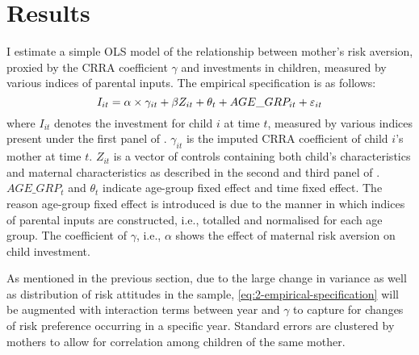 \documentclass[]{article}
\begin{document}
\section{Results}
I estimate a simple OLS model of the relationship between mother's risk aversion, proxied by the CRRA coefficient $\gamma$ and investments in children, measured by various indices of parental inputs. The empirical specification is as follows:
\begin{equation}
	I_{it} = \alpha \times \gamma_{it} + \beta{\boldmath Z_{it}} + \theta_t + AGE\_GRP_{it} + \varepsilon_{it}
	\label{eq:2-empirical-specification}
\end{equation}
where $I_{it}$ denotes the investment for child $i$ at time $t$, measured by various indices present under the first panel of . $\gamma_{it}$ is the imputed CRRA coefficient of child $i$'s mother at time $t$. $Z_{it}$ is a vector of controls containing both child's characteristics and maternal characteristics as described in the second and third panel of . $AGE\_GRP_t$ and $\theta_t$ indicate age-group fixed effect and time fixed effect. The reason age-group fixed effect is introduced is due to the manner in which indices of parental inputs are constructed, i.e., totalled and normalised for each age group. The coefficient of $\gamma$, i.e., $\alpha$ shows the effect of maternal risk aversion on child investment. 

As mentioned in the previous section, due to the large change in variance as well as distribution of risk attitudes in the sample, \eqref{eq:2-empirical-specification} will be augmented with interaction terms between year and $\gamma$ to capture for changes of risk preference occurring in a specific year. Standard errors are clustered by mothers to allow for correlation among children of the same mother. 
\end{document}
